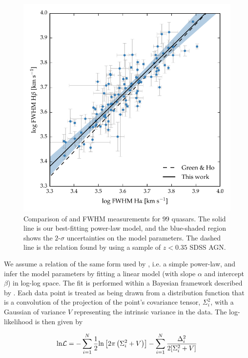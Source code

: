 \begin{figure}[t!]
    \centering
    \includegraphics[width=0.8\columnwidth]{figures/chapter03/ha_hb_width_comparison.pdf}
    \caption[{Comparison of \ha and \hb FWHM measurements for $99$ quasars.}]{Comparison of \ha and \hb FWHM measurements for $99$ quasars. The solid line is our best-fitting power-law model, and the blue-shaded region shows the $2$-$\sigma$ uncertainties on the model parameters. The dashed line is the relation found by \citet{greene05b} using a sample of $z<0.35$ SDSS AGN.}
    \label{fig:hahbcomp}
\end{figure}

We assume a relation of the same form used by \citet{greene05b}, i.e. a simple power-law, and infer the model parameters by fitting a linear model (with slope $\alpha$ and intercept $\beta$) in log-log space.
The fit is performed within a Bayesian framework described by \citet{hogg10}.
Each data point is treated as being drawn from a distribution function that is a convolution of the projection of the point's covariance tensor, $\Sigma_i^2$, with a Gaussian of variance $V$ representing the intrinsic variance in the data.
The log-likelihood is then given by

\begingroup\makeatletter{}\check@mathfonts
\begin{eqnarray}
  \text{ln} {\cal L} = - \sum_{i=1}^N \frac{1}{2} \text{ln}\left[2\pi\left(\Sigma_i^2 + V\right)\right] - \sum_{i=1}^N \frac{\Delta_i^2}{2[\Sigma_i^2 + V]}
\end{eqnarray}
\endgroup

